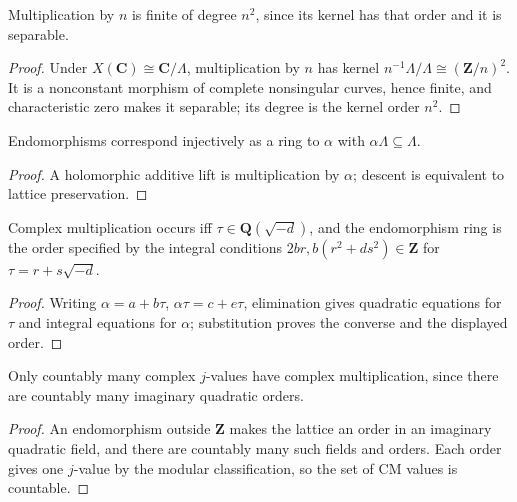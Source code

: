 \begin{corollary}[Multiplication]\label{ha-ch4-c417}
Multiplication by \(n\) is finite of degree \(n^2\), since its kernel has that
order and it is separable.
\end{corollary}
\begin{proof}
Under $X(\mathbf C)\cong\mathbf C/\Lambda$, multiplication by $n$ has kernel
$n^{-1}\Lambda/\Lambda\cong(\mathbf Z/n)^2$.  It is a nonconstant morphism of complete nonsingular
curves, hence finite, and characteristic zero makes it separable; its degree is the kernel order $n^2$.
\end{proof}
\begin{proposition}\label{ha-ch4-p418}
Endomorphisms correspond injectively as a ring to \(\alpha\) with
\(\alpha\Lambda\subseteq\Lambda\).
\end{proposition}
\begin{proof}A holomorphic additive lift is multiplication by \(\alpha\); descent is
equivalent to lattice preservation.\end{proof}
\begin{theorem}\label{ha-ch4-t419}
Complex multiplication occurs iff \(\tau\in\mathbf Q(\sqrt{-d})\), and the
endomorphism ring is the order specified by the integral conditions
\(2br,b(r^2+ds^2)\in\mathbf Z\) for \(\tau=r+s\sqrt{-d}\).
\end{theorem}
\begin{proof}Writing \(\alpha=a+b\tau\), \(\alpha\tau=c+e\tau\), elimination gives
quadratic equations for \(\tau\) and integral equations for \(\alpha\);
substitution proves the converse and the displayed order.\end{proof}
\begin{corollary}[CM count]\label{ha-ch4-c420}
Only countably many complex \(j\)-values have complex multiplication, since
there are countably many imaginary quadratic orders.
\end{corollary}
\begin{proof}
An endomorphism outside $\mathbf Z$ makes the lattice an order in an imaginary quadratic field, and
there are countably many such fields and orders.  Each order gives one $j$-value by the modular
classification, so the set of CM values is countable.
\end{proof}
